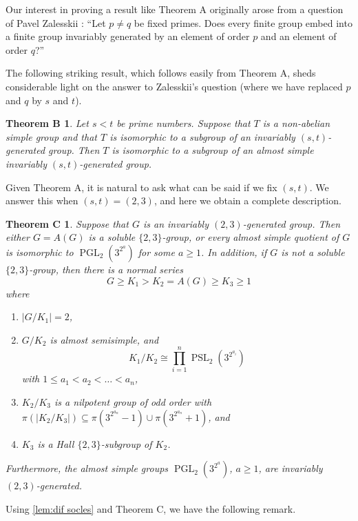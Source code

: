 \documentclass[12pt,a4paper]{amsart}
\newtheorem*{thmC}{Theorem C}
\newtheorem*{thmB}{Theorem B}
\DeclareMathOperator{\PGL}{PGL}
\DeclareMathOperator{\PSL}{PSL}
\begin{document}
Our interest in proving a result like Theorem A  originally arose from a question of  Pavel Zalesskii   \cite[Question 21.142]{khukhro2026unsolvedproblemsgrouptheory}: ``Let $p \ne q$ be fixed primes. Does   every finite
group embed into a finite group invariably generated by an element of order $p$ and an
element of order $q$?''

The following striking result, which follows easily from Theorem A, sheds considerable light on the answer to Zalesskii's question (where we have replaced $p$ and $q$ by $s$ and $t$).


\begin{thmB}\label{thm:cor1}
 Let $s<t$ be prime numbers.  Suppose that $T$ is a non-abelian simple group and that $T$ is isomorphic to a subgroup of an invariably $(s,t)$-generated group. Then $T$ is isomorphic to a subgroup of an almost simple invariably $(s,t)$-generated group.
 \end{thmB}




Given Theorem A, it is natural to ask what can be said if we fix $(s,t)$. We answer this when $(s,t)=(2,3)$, and here we obtain a complete description.



\begin{thmC}\label{thm:main theorem}
Suppose that $G$ is an invariably $(2,3)$-generated group.
Then either $G=A(G)$ is a soluble $\{2,3\}$-group, or every almost simple quotient of $G$ is isomorphic to $\PGL_2(3^{2^a})$ for some $a\ge 1$.
In addition, if $G$ is not a soluble $\{2,3\}$-group, then there is a normal series
$$G\ge K_1> K_2= A(G)\ge K_3\ge 1$$ where
\begin{enumerate}
\item $|G/K_1|=2$,
\item $G/K_2$ is almost semisimple, and $$K_1/K_2 \cong \prod_{i=1}^n \PSL_2(3^{2^{a_i}})$$ with $1\le a_1< a_2<\dots <a_n$,
\item $K_2/K_3$ is a nilpotent group of odd order  with \\ $\pi(|K_2/K_3|) \subseteq \pi( 3^{2^{a_n}}-1)\cup \pi(3^{2^{a_n}}+1)$, and
\item $K_3$ is a Hall $\{2,3\}$-subgroup of $K_2$.
\end{enumerate}
Furthermore, the almost simple groups $\PGL_2(3^{2^a})$, $a\ge 1$, are invariably $(2,3)$-generated.
\end{thmC}

Using \cref{lem:dif socles} and Theorem C, we  have the following remark.
\end{document}

